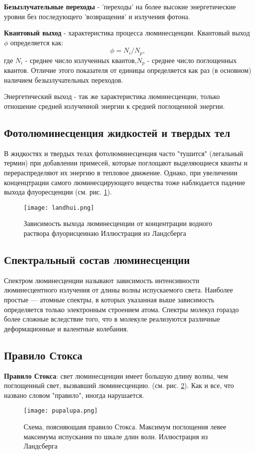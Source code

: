 \textbf{Безызлучательные переходы} - 'переходы' на более высокие энергетические уровни без последующего 'возвращения' и излучения фотона. 

\textbf{Квантовый выход} - характеристика процесса люминесценции. Квантовый выход \(\phi\) определяется как:
\begin{equation}
    \phi = N_i / N_p,
\end{equation}
где \(N_i\) - среднее число излученных квантов,\(N_p\) - среднее число поглощенных квантов. Отличие этого показателя от единицы определяется как раз (в основном) наличием безызлучательных переходов.


{Энергетический выход} - так же характеристика люминесценции, только отношение средней излученной энергии к средней поглощенной энергии.

\subsection{Фотолюминесценция жидкостей и твердых тел}
В жидкостях и твердых телах фотолюминесценция часто "тушится" (легальный термин) при добавлении примесей, которые поглощают выделяющиеся кванты и перераспределяют их энергию в тепловое движение. Однако, при увеличении конценцтрации самого люминесцирующего вещества тоже наблюдается падение выхода флуоресценции (см. рис. \ref{landhui}).
\begin{figure}
    \centering
    \texttt{[image: landhui.png]}
    \caption{Зависимость выхода люминесценции от концентрации водного раствора флуорисцеинаю Иллюстрация из Ландсберга}
    \label{landhui}
\end{figure}

\subsection{Спектральный состав люминесценции}
Спектром люминесценции называют зависимость интенсивности люминесцентного излучения от длины волны испускаемого света. Наиболее простые — атомные спектры, в которых указанная выше зависимость определяется только электронным строением атома. Спектры молекул гораздо более сложные вследствие того, что в молекуле реализуются различные деформационные и валентные колебания. 

\subsection{Правило Стокса}
\textbf{Правило Стокса}: свет люминесценции имеет большую длину волны, чем поглощенный свет, вызвавший люминесценцию. (см. рис. \ref{lupaipupa}). Как и все, что названо словом "правило", иногда нарушается.
\begin{figure}[h!]
    \centering
    \texttt{[image: pupalupa.png]}
    \caption{Схема, поясняющаяя правило Стокса. Максимум поглощения левее максимума испускания по шкале длин волн. Иллюстрация из Ландсберга}
    \label{lupaipupa}
\end{figure}

